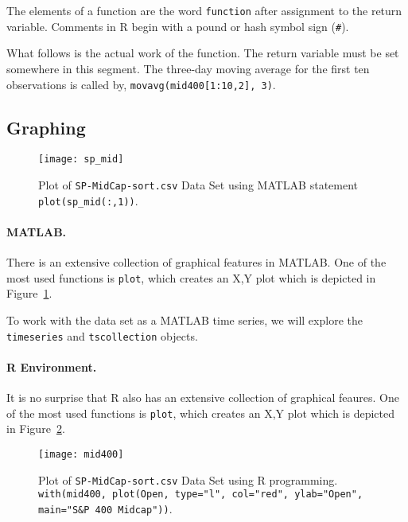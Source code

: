 The elements of a function are the word \texttt{function} after assignment to the return variable. Comments in R begin with a pound or hash symbol sign (\texttt{\#}). 

What follows is the actual work of the function. The return variable must be set somewhere in this segment. The three-day moving average for the first ten observations is called by, \texttt{movavg(mid400[1:10,2], 3)}.

\subsection{Graphing}
\begin{figure}[tbh]
  \centering
  \texttt{[image: sp\_mid]}
  \caption[\texttt{SP-MidCap-sort.csv} Data Set in MATLAB]{Plot of \texttt{SP-MidCap-sort.csv} Data Set using MATLAB statement \texttt{plot(sp\_mid(:,1))}.}
  \label{figure:spmid}
\end{figure}
\paragraph{MATLAB.} There is an extensive collection of graphical features in MATLAB.  One of the most used functions is \texttt{plot}, which creates an X,Y plot which is depicted in Figure~\ref{figure:spmid}.

To work with the data set as a MATLAB time series, we will explore the \texttt{timeseries} and \texttt{tscollection} objects. 

\paragraph{R Environment.} It is no surprise that R also has an extensive collection of graphical feaures.  One of the most used functions is \texttt{plot}, which creates an X,Y plot which is depicted in Figure~\ref{figure:mid400}.
\begin{figure}[tbh]
  \centering
  \texttt{[image: mid400]}
  \caption[\texttt{SP-MidCap-sort.csv} Data Set in R]{Plot of \texttt{SP-MidCap-sort.csv} Data Set using R programming. \linebreak \texttt{with(mid400, plot(Open, type="l", col="red", ylab="Open", main="S\&P 400 Midcap"))}.}
  \label{figure:mid400}
\end{figure}

